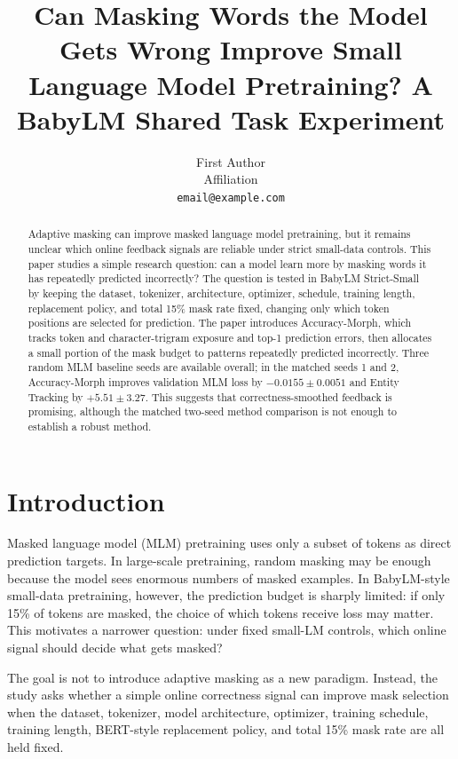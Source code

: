 \documentclass[11pt]{article}
\title{Can Masking Words the Model Gets Wrong Improve Small Language Model Pretraining? A BabyLM Shared Task Experiment}
\author{
  First Author \\
  Affiliation \\
  \texttt{email@example.com}
}
\begin{document}
\maketitle

\begin{abstract}
Adaptive masking can improve masked language model pretraining, but it remains unclear which online feedback signals are reliable under strict small-data controls.
This paper studies a simple research question: can a model learn more by masking words it has repeatedly predicted incorrectly?
The question is tested in BabyLM Strict-Small by keeping the dataset, tokenizer, architecture, optimizer, schedule, training length, replacement policy, and total 15\% mask rate fixed, changing only which token positions are selected for prediction.
The paper introduces Accuracy-Morph, which tracks token and character-trigram exposure and top-1 prediction errors, then allocates a small portion of the mask budget to patterns repeatedly predicted incorrectly.
Three random MLM baseline seeds are available overall; in the matched seeds 1 and 2, Accuracy-Morph improves validation MLM loss by $-0.0155 \pm 0.0051$ and Entity Tracking by $+5.51 \pm 3.27$.
This suggests that correctness-smoothed feedback is promising, although the matched two-seed method comparison is not enough to establish a robust method.
\end{abstract}

\section{Introduction}

Masked language model (MLM) pretraining uses only a subset of tokens as direct prediction targets.
In large-scale pretraining, random masking may be enough because the model sees enormous numbers of masked examples.
In BabyLM-style small-data pretraining, however, the prediction budget is sharply limited: if only 15\% of tokens are masked, the choice of which tokens receive loss may matter.
This motivates a narrower question: under fixed small-LM controls, which online signal should decide what gets masked?

The goal is not to introduce adaptive masking as a new paradigm.
Instead, the study asks whether a simple online correctness signal can improve mask selection when the dataset, tokenizer, model architecture, optimizer, training schedule, training length, BERT-style replacement policy, and total 15\% mask rate are all held fixed.
\end{document}
